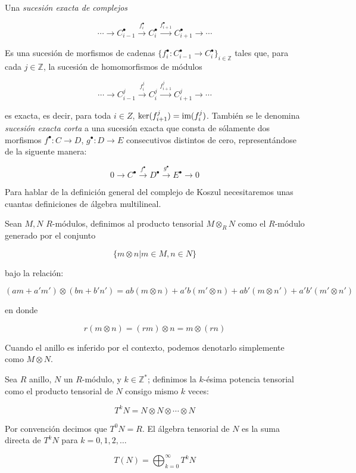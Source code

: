 \begin{definition}

Una \emph{sucesión exacta de complejos}

$$ \cdots \rightarrow C^{\bullet}_{i-1} \xrightarrow{f^{\bullet}_i} C^{\bullet}_i \xrightarrow{f^{\bullet}_{i+1}} C^{\bullet}_{i+1} \rightarrow \cdots$$

Es una sucesión de morfismos de cadenas $\{f^{\bullet}_i:C^{\bullet}_{i-1}\rightarrow C^{\bullet}_i\}_{i \in \mathbb{Z}}$ tales que, para cada $j\in \mathbb{Z}$, la sucesión de homomorfismos de módulos

$$ \cdots \rightarrow C^{j}_{i-1} \xrightarrow{f^j_i} C^{j}_i \xrightarrow{f^j_{i+1}} C^{j}_{i+1} \rightarrow \cdots$$

es exacta, es decir, para toda $i \in Z$, $\ker(f^j_{i+1}) = \textrm{im}(f^j_i)$. También se le denomina \emph{sucesión exacta corta} a una sucesión exacta que consta de sólamente dos morfismos $f^\bullet:C\rightarrow D$, $g^\bullet:D\rightarrow E$ consecutivos distintos de cero, representándose de la siguente manera:

$$ 0 \rightarrow C^{\bullet} \xrightarrow{f^{\bullet}} D^{\bullet} \xrightarrow{g^{\bullet}} E^{\bullet} \rightarrow 0$$

\end{definition}

Para hablar de la definición general del complejo de Koszul necesitaremos unas cuantas definiciones de álgebra multilineal.

\begin{definition}
Sean $M, N$ $R$-módulos, definimos al producto tensorial $M \otimes_{R} N$ como el $R$-módulo generado por el conjunto 

$$\{m \otimes n | m \in M, n \in N\}$$

bajo la relación:

$$(am + a'm')\otimes(bn + b'n') = ab(m\otimes n) + a'b(m'\otimes n) + ab'(m\otimes n') + a'b'(m'\otimes n')$$

en donde 

$$ r(m \otimes n) = (rm) \otimes n = m \otimes (rn) $$

Cuando el anillo es inferido por el contexto, podemos denotarlo simplemente como $M \otimes N$.
\end{definition}

\begin{definition}
Sea $R$ anillo, $N$ un $R$-módulo, y $k \in \mathbb{Z}^*$; definimos la $k$-ésima potencia tensorial como el producto tensorial de $N$ consigo mismo $k$ veces:

$$ T^kN = N \otimes N \otimes \cdots \otimes N $$

Por convención decimos que $T^0N = R$. El álgebra tensorial de $N$ es la suma directa de $T^kN$ para $k = 0, 1, 2, \dots$

$$ T(N) = \bigoplus_{k=0}^{\infty} T^kN $$
\end{definition}


